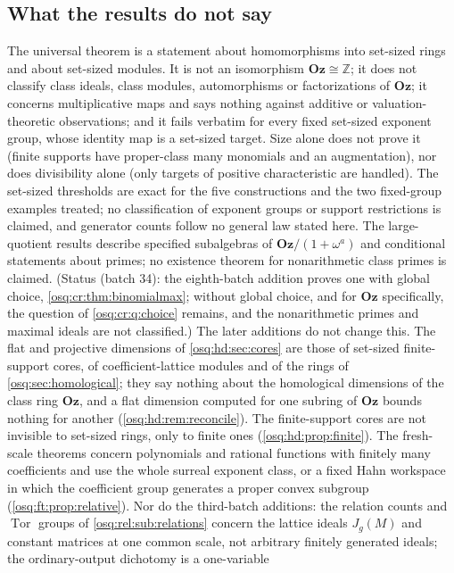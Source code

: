 \documentclass[11pt,letterpaper]{article}
\numberwithin{equation}{section}
\theoremstyle{definition}
\theoremstyle{remark}
\theoremstyle{plain}
\newcommand{\Oz}{\mathbf{Oz}}
\newcommand{\Z}{\mathbb Z}
\newcommand{\Tor}{\operatorname{Tor}}
\begin{document}
\subsection{What the results do not say}\label{osq:sub:notsay}
The universal theorem is a statement about homomorphisms into set-sized rings and about
set-sized modules. It is not an isomorphism $\Oz\cong\Z$; it does not classify class ideals,
class modules, automorphisms or factorizations of $\Oz$; it concerns multiplicative maps and
says nothing against additive or valuation-theoretic observations; and it fails verbatim for every
fixed set-sized exponent group, whose identity map is a set-sized target. Size alone does not prove
it (finite supports have proper-class many monomials and an augmentation), nor does divisibility
alone (only targets of positive characteristic are handled). The set-sized thresholds are exact
for the five constructions and the two fixed-group examples treated; no classification of exponent
groups or support restrictions is claimed, and generator counts follow no general law stated here.
The large-quotient results describe specified subalgebras of $\Oz/(1+\omega^a)$ and conditional
statements about primes; no existence theorem for nonarithmetic class primes is claimed. (Status (batch 34): the eighth-batch addition proves
one with global choice, \cref{osq:cr:thm:binomialmax}; without global choice, and for $\Oz$ specifically, the question of \cref{osq:cr:q:choice}
remains, and the nonarithmetic primes and maximal ideals are not classified.)
The later additions do not change this. The flat and projective dimensions of \cref{osq:hd:sec:cores} are those of
set-sized finite-support cores, of coefficient-lattice modules and of the rings of \cref{osq:sec:homological}; they
say nothing about the homological dimensions of the class ring $\Oz$, and a flat dimension computed for one subring of
$\Oz$ bounds nothing for another (\cref{osq:hd:rem:reconcile}). The finite-support cores are not invisible to set-sized
rings, only to finite ones (\cref{osq:hd:prop:finite}). The fresh-scale theorems concern polynomials and rational
functions with finitely many coefficients and use the whole surreal exponent class, or a fixed Hahn workspace in which the coefficient group
generates a proper convex subgroup (\cref{osq:ft:prop:relative}). Nor do the third-batch additions:
the relation counts and $\Tor$ groups of \cref{osq:rel:sub:relations} concern the lattice ideals $J_g(M)$ and constant
matrices at one common scale, not arbitrary finitely generated ideals; the ordinary-output dichotomy is a one-variable
\end{document}
